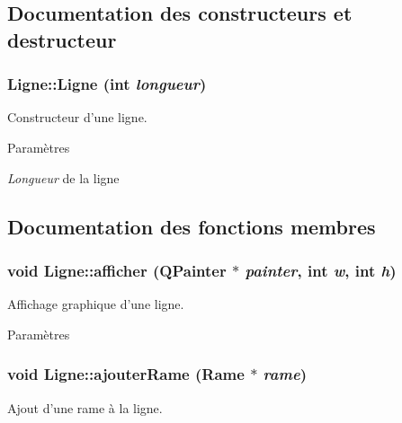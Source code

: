 \subsection{Documentation des constructeurs et destructeur}
\hypertarget{classLigne_a4c5b5e8f49c5b37724685e2c4799fa60}{
\subsubsection[{Ligne}]{\setlength{\rightskip}{0pt plus 5cm}Ligne::Ligne (int {\em longueur})}}
\label{classLigne_a4c5b5e8f49c5b37724685e2c4799fa60}


Constructeur d'une ligne. 


\begin{DoxyParams}{Paramètres}
\item[{\em Longueur}]de la ligne \end{DoxyParams}


\subsection{Documentation des fonctions membres}
\hypertarget{classLigne_a548b1d11662e76b5bb05a8a4c1bd96de}{
\subsubsection[{afficher}]{\setlength{\rightskip}{0pt plus 5cm}void Ligne::afficher (QPainter $\ast$ {\em painter}, \/  int {\em w}, \/  int {\em h})}}
\label{classLigne_a548b1d11662e76b5bb05a8a4c1bd96de}


Affichage graphique d'une ligne. 


\begin{DoxyParams}{Paramètres}
\item[{\em }]\end{DoxyParams}
\hypertarget{classLigne_a4e6647ba0bf16758fecd57d38266c2f0}{
\subsubsection[{ajouterRame}]{\setlength{\rightskip}{0pt plus 5cm}void Ligne::ajouterRame ({\bf Rame} $\ast$ {\em rame})}}
\label{classLigne_a4e6647ba0bf16758fecd57d38266c2f0}


Ajout d'une rame à la ligne. 


